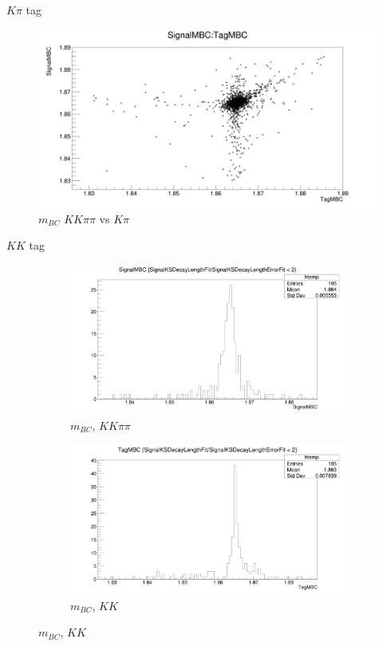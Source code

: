 \documentclass{beamer}
\begin{document}
\begin{frame}{$K\pi$ tag}
  \begin{figure}
    \centering
    \includegraphics[width=\textwidth]{KpiDoubleTag_ScatterPlotMBC.png}
    \caption{$m_{BC}$ $KK\pi\pi$ vs $K\pi$}
  \end{figure}
\end{frame}

\begin{frame}{$KK$ tag}
  \begin{figure}
    \centering
    \begin{subfigure}{0.5\textwidth}
      \centering
      \includegraphics[width=\textwidth]{KKDoubleTag_SignalMBC.png}
      \caption{$m_{BC}$, $KK\pi\pi$}
    \end{subfigure}%
    \begin{subfigure}{0.5\textwidth}
      \centering
      \includegraphics[width=\textwidth]{KKDoubleTag_TagMBC.png}
      \caption{$m_{BC}$, $KK$}
    \end{subfigure}
  \end{figure}
\end{frame}
\end{document}
